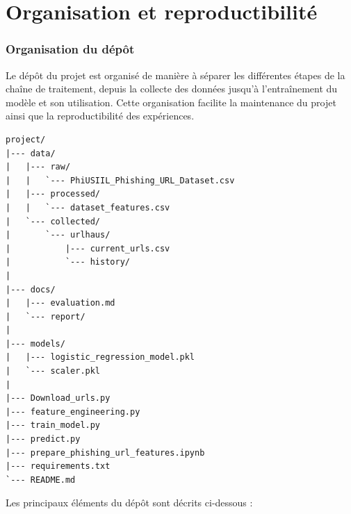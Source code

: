 \documentclass[11pt,a4paper]{report}
\begin{document}
\chapter{Organisation et reproductibilité}

\subsection{Organisation du dépôt}

Le dépôt du projet est organisé de manière à séparer les différentes étapes de la chaîne de traitement, depuis la collecte des données jusqu'à l'entraînement du modèle et son utilisation. Cette organisation facilite la maintenance du projet ainsi que la reproductibilité des expériences.

\begin{lstlisting}[language={},basicstyle=\ttfamily\small]
project/
|--- data/
|   |--- raw/
|   |   `--- PhiUSIIL_Phishing_URL_Dataset.csv
|   |--- processed/
|   |   `--- dataset_features.csv
|   `--- collected/
|       `--- urlhaus/
|           |--- current_urls.csv
|           `--- history/
|
|--- docs/
|   |--- evaluation.md
|   `--- report/
|
|--- models/
|   |--- logistic_regression_model.pkl
|   `--- scaler.pkl
|
|--- Download_urls.py
|--- feature_engineering.py
|--- train_model.py
|--- predict.py
|--- prepare_phishing_url_features.ipynb
|--- requirements.txt
`--- README.md
\end{lstlisting}

Les principaux éléments du dépôt sont décrits ci-dessous :
\end{document}
